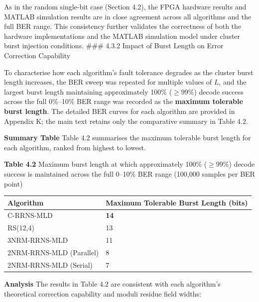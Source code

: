 \documentclass[
  12pt,
  a4paper]{report}
\newcounter{none} %
\begin{document}
As in the random single-bit case (Section 4.2), the FPGA hardware
results and MATLAB simulation results are in close agreement across all
algorithms and the full BER range. This consistency further validates
the correctness of both the hardware implementations and the MATLAB
simulation model under cluster burst injection conditions. \#\#\# 4.3.2
Impact of Burst Length on Error Correction Capability

To characterise how each algorithm's fault tolerance degrades as the
cluster burst length increases, the BER sweep was repeated for multiple
values of \(L\), and the largest burst length maintaining approximately
100\% (\(\geq 99\%\)) decode success across the full 0\%--10\% BER range
was recorded as the \textbf{maximum tolerable burst length}. The
detailed BER curves for each algorithm are provided in Appendix K; the
main text retains only the comparative summary in Table 4.2.

\textbf{Summary Table} Table 4.2 summarises the maximum tolerable burst
length for each algorithm, ranked from highest to lowest.

\textbf{Table 4.2} Maximum burst length at which approximately 100\%
(\(\geq 99\%\)) decode success is maintained across the full 0--10\% BER
range (100,000 samples per BER point)

{\def\LTcaptype{none} %
\begin{longtable}[]{@{}ll@{}}
\toprule\noalign{}
Algorithm & Maximum Tolerable Burst Length (bits) \\
\midrule\noalign{}
\endhead
\bottomrule\noalign{}
\endlastfoot
C-RRNS-MLD & \textbf{14} \\
RS(12,4) & 13 \\
3NRM-RRNS-MLD & 11 \\
2NRM-RRNS-MLD (Parallel) & 8 \\
2NRM-RRNS-MLD (Serial) & 7 \\
\end{longtable}
}

\textbf{Analysis} The results in Table 4.2 are consistent with each
algorithm's theoretical correction capability and moduli residue field
widths:
\end{document}
